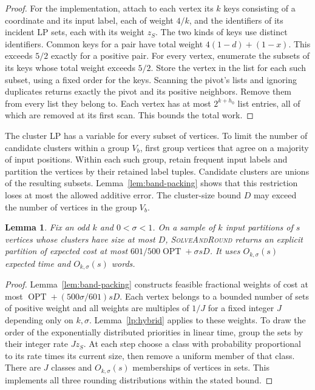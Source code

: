 \documentclass[11pt]{article}
\newtheorem{lemma}[theorem]{Lemma}
\newcommand{\OPT}{\operatorname{OPT}}
\newcommand{\BandSeed}{\textup{\textsc{SolveAndRound}}}
\begin{document}
\begin{proof}
For the implementation, attach to each vertex its $k$ keys consisting
of a coordinate and its input label, each of weight $4/k$, and the
identifiers of its incident LP sets, each with its weight $z_S$.
The two kinds of keys use distinct identifiers. Common keys for a pair
have total weight $4(1-d)+(1-x)$. This exceeds $5/2$ exactly for a
positive pair. For every vertex, enumerate the subsets of its keys
whose total weight exceeds $5/2$. Store the vertex in the list for
each such subset, using a fixed order for the keys. Scanning the
pivot's lists and ignoring duplicates returns exactly the pivot and
its positive neighbors. Remove them from every list they belong to.
Each vertex has at most $2^{k+h_0}$ list entries, all of which are
removed at its first scan. This bounds the total work.
\end{proof}

The cluster LP has a variable for every subset of vertices. To limit
the number of candidate clusters within a group $V_b$, first group
vertices that agree on a majority of input positions. Within each such
group, retain frequent input labels and partition the vertices by their
retained label tuples. Candidate clusters are unions of the resulting
subsets.
Lemma~\ref{lem:band-packing} shows that this restriction loses at most
the allowed additive error. The cluster-size bound $D$ may exceed the
number of vertices in the group $V_b$.

\begin{lemma}\label{band:linear-seed}
Fix an odd $k$ and $0<\sigma<1$. On a sample of $k$ input partitions
of $s$ vertices whose clusters have size at most $D$, \BandSeed{}
returns an explicit partition of expected cost at most
$601/500\OPT+\sigma sD$. It uses $O_{k,\sigma}(s)$ expected
time and $O_{k,\sigma}(s)$ words.
\end{lemma}
\begin{proof}
Lemma~\ref{lem:band-packing} constructs feasible fractional weights
of cost at most $\OPT+(500\sigma/601)sD$. Each vertex belongs to
a bounded number of sets of positive weight and all weights are
multiples of $1/J$ for a fixed integer $J$ depending only on
$k,\sigma$. Lemma~\ref{lp:hybrid} applies to these weights. To draw
the order of the exponentially distributed priorities in linear time, group the sets by their integer
rate $Jz_S$. At each step choose a class with probability
proportional to its rate times its current size, then remove a
uniform member of that class. There are $J$ classes and
$O_{k,\sigma}(s)$ memberships of vertices in sets. This implements all
three rounding distributions within the stated bound.
\end{proof}
\end{document}
